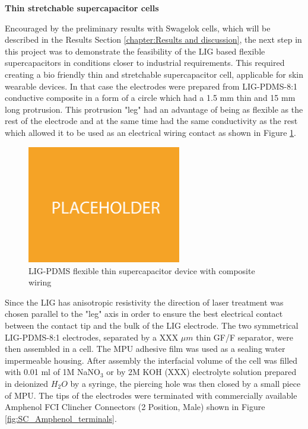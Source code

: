 \textbf{Thin stretchable supercapacitor cells}

Encouraged by the preliminary results with Swagelok cells, which will be described in the Results Section \ref{chapter:Results and discussion}, the next step in this project was to demonstrate the feasibility of the LIG based flexible supercapacitors in conditions closer to industrial requirements. This required creating a bio friendly thin and stretchable supercapacitor cell, applicable for skin wearable devices. In that case the electrodes were prepared from LIG-PDMS-8:1 conductive composite in a form of a circle which had a 1.5 mm thin and 15 mm long protrusion. This protrusion "leg" had an advantage of being as flexible as the rest of the electrode and at the same time had the same conductivity as the rest which allowed it to be used as an electrical wiring contact as shown in Figure \ref{fig:LIG-PDMS-supercap}. 

\begin{figure}[H]
\centering
\includegraphics[width=0.6\textwidth]{Figures/Placeholder.jpg}
\medskip
\captionsetup{width=0.6\linewidth}
\caption{LIG-PDMS flexible thin supercapacitor device with composite wiring}
\label{fig:LIG-PDMS-supercap}
\end{figure}

Since the LIG has anisotropic resistivity the direction of laser treatment was chosen parallel to the "leg" axis in order to ensure the best electrical contact between the contact tip and the bulk of the LIG electrode. The two symmetrical LIG-PDMS-8:1 electrodes, separated by a XXX $\mu m$ thin GF/F separator, were then assembled in a cell. The MPU adhesive film was used as a sealing water impermeable housing. After assembly the interfacial volume of the cell was filled with 0.01 ml of 1M NaNO$_3$ or by 2M KOH (XXX) electrolyte solution prepared in deionized $H_2O$ by a syringe, the piercing hole was then closed by a small piece of MPU. The tips of the electrodes were terminated with commercially available Amphenol FCI Clincher Connectors (2 Position, Male) shown in Figure \ref{fig:SC_Amphenol_terminals}. 

